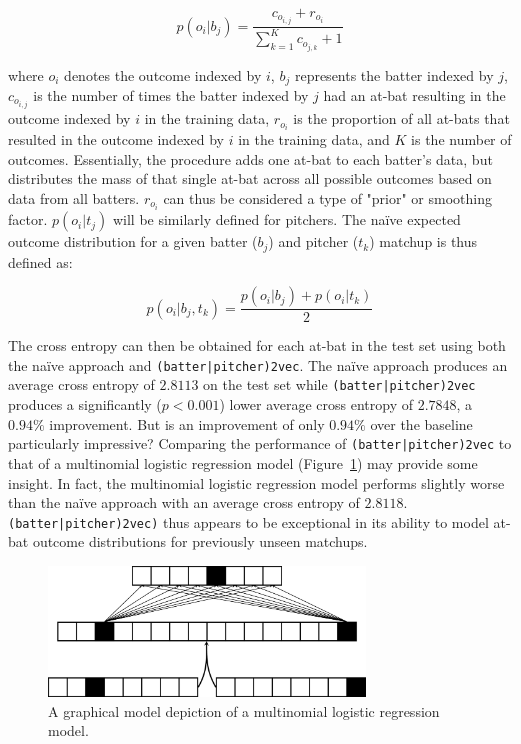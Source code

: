 \documentclass{article}
\begin{document}
\begin{equation}
\label{eqn:batter_naïve}
p(o_i|b_j)=\frac{c_{o_{i,j}} + r_{o_i}}{\sum_{k=1}^{K} c_{o_{j,k}} + 1}
\end{equation}

where $o_i$ denotes the outcome indexed by $i$, $b_j$ represents the batter indexed by $j$, $c_{o_{i,j}}$ is the number of times the batter indexed by $j$ had an at-bat resulting in the outcome indexed by $i$ in the training data, $r_{o_i}$ is the proportion of all at-bats that resulted in the outcome indexed by $i$ in the training data, and $K$ is the number of outcomes. Essentially, the procedure adds one at-bat to each batter's data, but distributes the mass of that single at-bat across all possible outcomes based on data from all batters. $r_{o_i}$ can thus be considered a type of "prior" or smoothing factor. $p(o_i|t_j)$ will be similarly defined for pitchers. The naïve expected outcome distribution for a given batter ($b_j$) and pitcher ($t_k$) matchup is thus defined as:

\begin{equation}
\label{eqn:naïve}
p(o_i|b_j,t_k) = \frac{p(o_i|b_j) + p(o_i|t_k)}{2}
\end{equation}

The cross entropy can then be obtained for each at-bat in the test set using both the naïve approach and \texttt{(batter|pitcher)2vec}. The naïve approach produces an average cross entropy of $2.8113$ on the test set while \texttt{(batter|pitcher)2vec} produces a significantly ($p < 0.001$) lower average cross entropy of $2.7848$, a $0.94\%$ improvement. But is an improvement of only $0.94\%$ over the baseline particularly impressive? Comparing the performance of \texttt{(batter|pitcher)2vec} to that of a multinomial logistic regression model (Figure~\ref{fig:log_reg}) may provide some insight. In fact, the multinomial logistic regression model performs slightly worse than the naïve approach with an average cross entropy of $2.8118$. \texttt{(batter|pitcher)2vec)} thus appears to be exceptional in its ability to model at-bat outcome distributions for previously unseen matchups.

\begin{figure}
\centering
\includegraphics[width=0.75\textwidth,height=\textheight,keepaspectratio]{logistic_regression.png}
\caption{A graphical model depiction of a multinomial logistic regression model.}
\label{fig:log_reg}
\end{figure}
\end{document}
